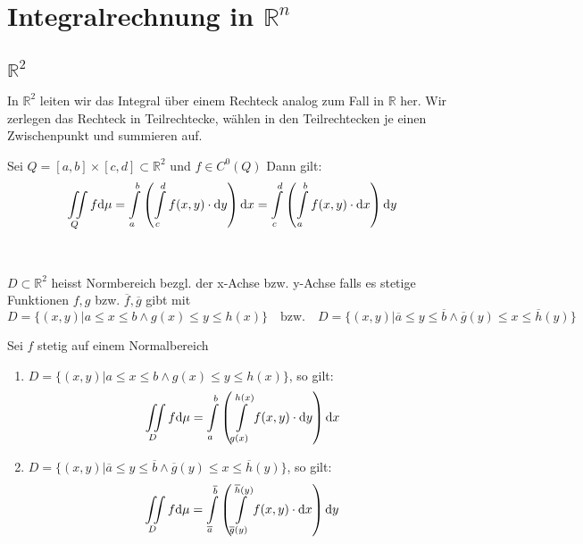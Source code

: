 \section{Integralrechnung in $\mathbb{R}^n$}
	\subsection{$\mathbb{R}^2$}
		In $\mathbb{R}^2$ leiten wir das Integral über einem Rechteck analog zum Fall in $\mathbb{R}$ her. Wir zerlegen das Rechteck in Teilrechtecke, wählen in den Teilrechtecken je einen Zwischenpunkt und summieren auf. \\
		\begin{theorem}[Fubini]
			Sei $Q = [a,b]\times[c,d] \subset \mathbb{R}^2$ und $f \in C^0(Q)$ Dann gilt:
			$$ \iint\limits_{Q} f \mathrm{d} \mu = \int\limits_a^b\left(\int\limits_c^d f(x,y)\cdot \mathrm{d} y \right) \mathrm{d} x = \int\limits_c^d\left(\int\limits_a^b f(x,y)\cdot \mathrm{d} x \right) \mathrm{d} y
			$$
		\end{theorem}
		\\[1em]
		\begin{definition}[Normbereich]
			$D \subset \mathbb{R}^2$ heisst Normbereich bezgl. der x-Achse bzw. y-Achse falls es stetige Funktionen $f,g$ bzw. $\overline{f}, \overline{g}$ gibt mit
			$$ D = \{(x,y) \vert a \leq x \leq b \wedge g(x) \leq y \leq h(x)\} \quad\text{bzw.}\quad D = \{(x,y) \vert \overline{a} \leq y \leq \overline{b} \wedge \overline{g}(y) \leq x \leq \overline{h}(y)\} $$
		\end{definition}
		\begin{theorem}
			Sei $f$ stetig auf einem Normalbereich
			\begin{enumerate}
				\item $D = \{(x,y) \vert a \leq x \leq b \wedge g(x) \leq y \leq h(x)\}$, so gilt:
				$$ \iint\limits_{D} f \mathrm{d} \mu = \int\limits_a^b\left(\int\limits_{g(x)}^{h(x)} f(x,y)\cdot \mathrm{d} y \right) \mathrm{d} x	$$
				\item $D = \{(x,y) \vert \overline{a} \leq y \leq \overline{b} \wedge \overline{g}(y) \leq x \leq \overline{h}(y)\} $, so gilt:
				$$ \iint\limits_{D} f \mathrm{d} \mu = \int\limits_{\overline{a}}^{\overline{b}}\left(\int\limits_{\overline{g}(y)}^{\overline{h}(y)} f(x,y)\cdot \mathrm{d} x \right) \mathrm{d} y	$$
			\end{enumerate}
		\end{theorem}
